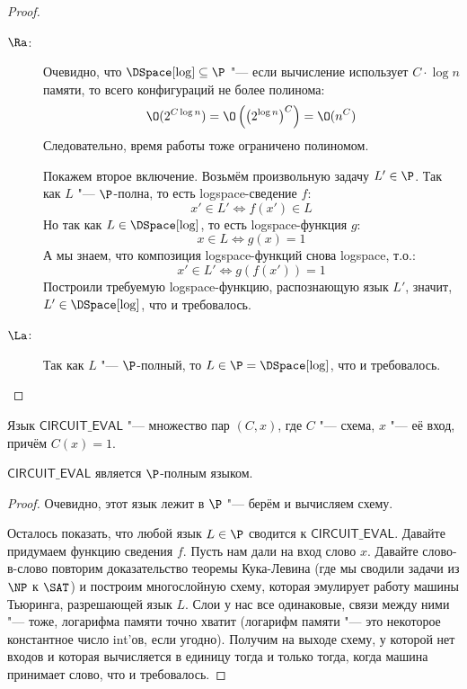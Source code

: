 	\begin{proof}
		\begin{description}
			\item[$\Ra$:]
				Очевидно, что $\DSpace[\log] \subseteq \P$ "--- если вычисление использует $C \cdot \log n$ памяти,
				то всего конфигураций не более полинома:
				\[ \O(2^{C\log n})=\O\left(\left(2^{\log n}\right)^C\right)=\O(n^C) \]
				Следовательно, время работы тоже ограничено полиномом.

				Покажем второе включение.
				Возьмём произвольную задачу $L' \in \P$.
				Так как $L$ "--- $\P$-полна, то есть logspace-сведение $f$:
				\[ x' \in L' \iff f(x') \in L \]
				Но так как $L \in \DSpace[\log]$, то есть logspace-функция $g$:
				\[ x \in L \iff g(x) = 1 \]
				А мы знаем, что композиция logspace-функций снова logspace, т.о.:
				\[ x' \in L' \iff g(f(x')) = 1\]
				Построили требуемую logspace-функцию, распознающую язык $L'$, значит, $L' \in \DSpace[\log]$, что и требовалось.
			\item[$\La$:]
				Так как $L$ "--- $\P$-полный, то $L \in \P = \DSpace[\log]$, что и требовалось.
		\end{description}
	\end{proof}

	\begin{Def}
		Язык $\mathsf{CIRCUIT\_EVAL}$ "--- множество пар $(C, x)$, где $C$ "--- схема, $x$ "--- её вход, причём $C(x)=1$.
	\end{Def}
	\begin{assertion}
		$\mathsf{CIRCUIT\_EVAL}$ является $\P$-полным языком.
	\end{assertion}
	\begin{proof}
		Очевидно, этот язык лежит в $\P$ "--- берём и вычисляем схему.

		Осталось показать, что любой язык $L \in \P$ сводится к $\mathsf{CIRCUIT\_EVAL}$.
		Давайте придумаем функцию сведения $f$.
		Пусть нам дали на вход слово $x$.
		Давайте слово-в-слово повторим доказательство теоремы Кука-Левина (где мы сводили задачи из $\NP$ к $\SAT$) и построим
		многослойную схему, которая эмулирует работу машины Тьюринга, разрешающей язык $L$.
		Слои у нас все одинаковые, связи между ними "--- тоже, логарифма памяти точно хватит (логарифм памяти "--- это некоторое константное число int'ов, если угодно).
		Получим на выходе схему, у которой нет входов и которая вычисляется в единицу тогда и только тогда, когда машина принимает слово, что и требовалось.
	\end{proof}
